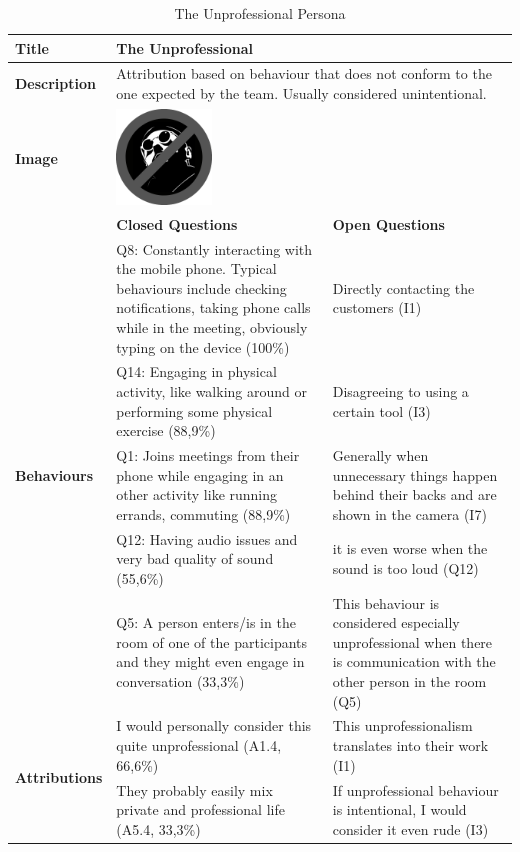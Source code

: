 \begin{longtable}[ht]{ p{}  p{} p{} }
\caption{The Unprofessional Persona}
\label{tab:theUnprofessional}\\
\hline
\textbf{Title} & The Unprofessional \\
    \hline
   \textbf{Description } & \multicolumn{2}{p{.80\textwidth}}{Attribution based on behaviour that does not conform to the one expected by the team. Usually considered unintentional.}  \\
   \hline
   \textbf{Image} &  \includegraphics[valign=t, width=1in, margin=0pt 3pt 0pt 3pt]{figures/TheUnprofessional.png} \\
    \hline
    & \textbf{Closed Questions} & \textbf{Open Questions} \\
    \hline
    \multirow{5}{3cm}{\textbf{Behaviours}}  & Q8: Constantly interacting with the mobile phone. Typical behaviours include checking notifications, taking phone calls while in the meeting, obviously typing on the device (100\%) &  Directly contacting the customers (I1) \\
     &  Q14: Engaging in physical activity, like walking around or performing some physical exercise (88,9\%) & Disagreeing to using a certain tool (I3) \\
     & Q1: Joins meetings from their phone while engaging in an other activity like running errands, commuting (88,9\%) & Generally when unnecessary things happen behind their backs and are shown in the camera (I7) \\
 	 & Q12: Having audio issues and very bad quality of sound (55,6\%) & it is even worse when the sound is too loud (Q12)  \\
 & Q5: A person enters/is in the room of one of the participants and they might even engage in conversation (33,3\%) & This behaviour is considered especially unprofessional when there is communication with the other person in the room (Q5) \\
    \hline
    \multirow{6}{3cm}{\textbf{Attributions}}  & I would personally consider this quite unprofessional (A1.4,  66,6\%) & This unprofessionalism translates into their work (I1) \\
     & They probably easily mix private and professional life (A5.4,  33,3\%) &  If unprofessional behaviour is intentional, I would consider it even rude (I3) \\

\end{longtable}
